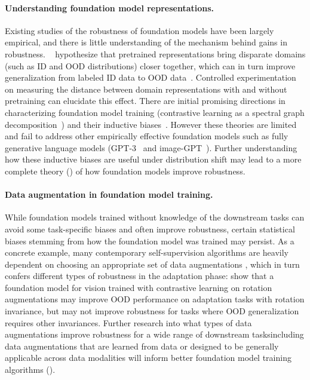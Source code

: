 \paragraph{Understanding foundation model representations.}
Existing studies of the robustness of foundation models have been largely empirical, and there is little understanding of the mechanism behind gains in robustness.
~\citet{sun2019unsupervised} hypothesize that pretrained representations
bring disparate domains (such as ID and OOD distributions) closer together, which can in turn improve generalization from labeled ID data to OOD data~\citep{ben2010theory}. Controlled experimentation on measuring the distance between domain representations with and without pretraining can elucidate this effect. There are initial promising directions in characterizing foundation model training (\eg contrastive learning as a spectral graph decomposition~\citep{haochen2021spectral}) and their inductive biases~\citep{SaMa20mat,lee2020predicting,zhang20ont,xie2020selftraining}.
However these theories are limited and fail to address other empirically effective foundation models such as fully generative language models (\eg GPT-3~\citep{brown2020gpt3} and image-GPT~\citep{chen2020imagegpt}). Further understanding how these inductive biases are useful under distribution shift may lead to a more complete theory () of how foundation models improve robustness. 

\paragraph{Data augmentation in foundation model training.} 
While foundation models trained without knowledge of the downstream tasks can avoid some task-specific biases and often improve robustness, certain statistical biases stemming from how the foundation model was trained may persist.
As a concrete example, many contemporary self-supervision algorithms are heavily dependent on choosing an appropriate set of data augmentations \citep{chen2020simclr}, which in turn confers different types of robustness in the adaptation phase: \citet{xiao2021contrastive} show that a foundation model for vision trained with contrastive learning on rotation augmentations may improve OOD performance on adaptation tasks with rotation invariance, but may not improve robustness for tasks where OOD generalization requires other invariances.
Further research into what types of data augmentations improve robustness for a wide range of downstream tasks\dash{}including data augmentations that are learned from data \citep{wong2020learningpert,Tamkin2021ViewmakerNL} or designed to be generally applicable across data modalities \citep{verma2021towards}\dash{}will inform better foundation model training algorithms ().

